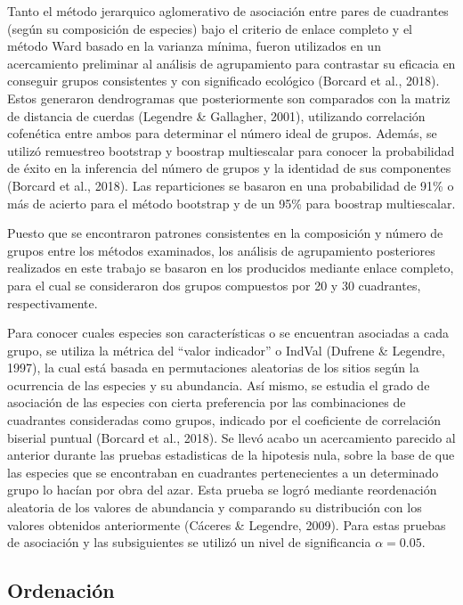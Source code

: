 \documentclass[11pt,]{article}
\begin{document}
Tanto el método jerarquico aglomerativo de asociación entre pares de
cuadrantes (según su composición de especies) bajo el criterio de enlace
completo y el método Ward basado en la varianza mínima, fueron
utilizados en un acercamiento preliminar al análisis de agrupamiento
para contrastar su eficacia en conseguir grupos consistentes y con
significado ecológico (Borcard et al., 2018). Estos generaron
dendrogramas que posteriormente son comparados con la matriz de
distancia de cuerdas (Legendre \& Gallagher, 2001), utilizando
correlación cofenética entre ambos para determinar el número ideal de
grupos. Además, se utilizó remuestreo bootstrap y boostrap multiescalar
para conocer la probabilidad de éxito en la inferencia del número de
grupos y la identidad de sus componentes (Borcard et al., 2018). Las
reparticiones se basaron en una probabilidad de 91\% o más de acierto
para el método bootstrap y de un 95\% para boostrap multiescalar.

Puesto que se encontraron patrones consistentes en la composición y
número de grupos entre los métodos examinados, los análisis de
agrupamiento posteriores realizados en este trabajo se basaron en los
producidos mediante enlace completo, para el cual se consideraron dos
grupos compuestos por 20 y 30 cuadrantes, respectivamente.

Para conocer cuales especies son características o se encuentran
asociadas a cada grupo, se utiliza la métrica del ``valor indicador'' o
IndVal (Dufrene \& Legendre, 1997), la cual está basada en permutaciones
aleatorias de los sitios según la ocurrencia de las especies y su
abundancia. Así mismo, se estudia el grado de asociación de las especies
con cierta preferencia por las combinaciones de cuadrantes consideradas
como grupos, indicado por el coeficiente de correlación biserial puntual
(Borcard et al., 2018). Se llevó acabo un acercamiento parecido al
anterior durante las pruebas estadisticas de la hipotesis nula, sobre la
base de que las especies que se encontraban en cuadrantes pertenecientes
a un determinado grupo lo hacían por obra del azar. Esta prueba se logró
mediante reordenación aleatoria de los valores de abundancia y
comparando su distribución con los valores obtenidos anteriormente
(Cáceres \& Legendre, 2009). Para estas pruebas de asociación y las
subsiguientes se utilizó un nivel de significancia \(\alpha = 0.05\).

\subsection{Ordenación}\label{ordenaciuxf3n}
\end{document}

